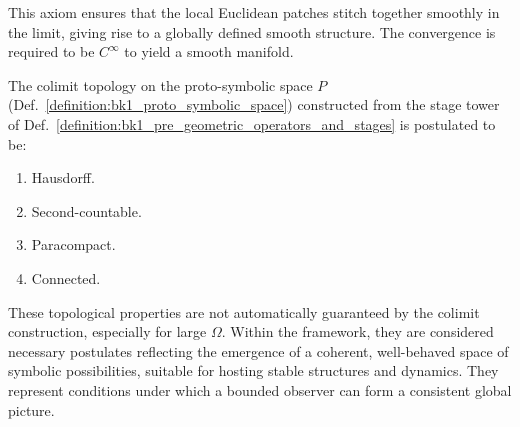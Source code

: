 \begin{remark}
This axiom ensures that the local Euclidean patches stitch together smoothly in the limit, giving rise to a globally defined smooth structure. The convergence is required to be $C^\infty$ to yield a smooth manifold.
\end{remark}
\begin{axiom}
\label{axiom:bk1_topological_regularity}
The colimit topology on the proto-symbolic space $P$ (Def.~\ref{definition:bk1_proto_symbolic_space}) constructed from the stage tower of Def.~\ref{definition:bk1_pre_geometric_operators_and_stages} is postulated to be:
\begin{enumerate}
    \item Hausdorff.
    \item Second-countable.
    \item Paracompact.
    \item Connected.
\end{enumerate}
\end{axiom}
\begin{remark}
These topological properties are not automatically guaranteed by the colimit construction, especially for large $\Omega$. Within the framework, they are considered necessary postulates reflecting the emergence of a coherent, well-behaved space of symbolic possibilities, suitable for hosting stable structures and dynamics. They represent conditions under which a bounded observer can form a consistent global picture.
\end{remark}
